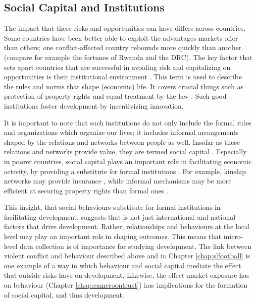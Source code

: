 \subsection{Social Capital and Institutions}
The impact that these risks and opportunities can have differs across countries. Some countries have been better able to exploit the advantages markets offer than others; one conflict-affected country rebounds more quickly than another (compare for example the fortunes of Rwanda and the DRC). The key factor that sets apart countries that are successful in avoiding risk and capitalizing on opportunities is their institutional environment \citep{Rodrik2004,Acemoglu2000}. This term is used to describe the rules and norms that shape (economic) life. It covers crucial things such as protection of property rights and equal treatment by the law \citep{Acemoglu2005}. Such good institutions  foster development by incentivizing innovation. %

It is important to note that such institutions do not only include the formal rules and organizations which organize our lives; it includes informal arrangements shaped by the relations and networks between people as well. Insofar as these relations and networks provide value, they are termed social capital \citep[see for a more detailed discussion of the definition of the term][]{Putnam2001}. Especially in poorer countries, social capital plays an important role in facilitating economic activity, by providing a substitute for formal institutions \citep{Knack1997}. For example, kinship networks may provide insurance \citep{DiFalco2011}, while informal mechanisms may be more efficient at securing property rights than formal ones \citep{Platteau1996}. 

This insight, that social behaviours substitute for formal institutions in facilitating development, suggests that is not just international and national factors that drive development. Rather, relationships and behaviours at the local level may play an important role in shaping outcomes. This means that micro-level data collection is of importance for studying development. The link between violent conflict and behaviour described above and in Chapter \ref{chap:slfootball} is one example of a way in which behaviour and social capital mediate the effect that outside risks have on development. Likewise, the effect market exposure has on behaviour (Chapter \ref{chap:cameroontrust}) has implications for the formation of social capital, and thus development. 

